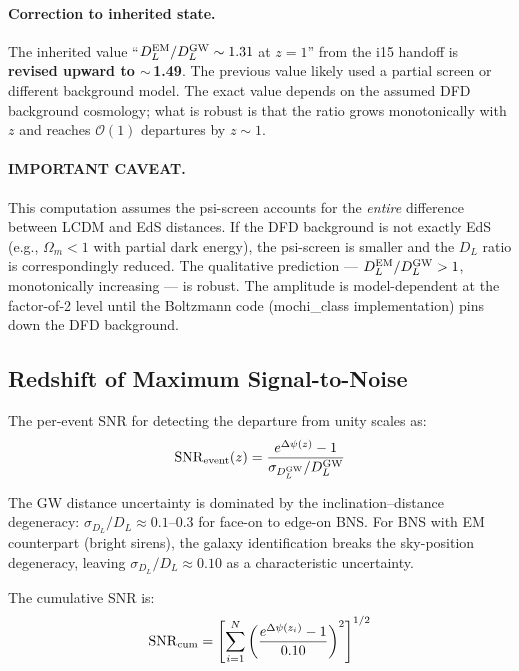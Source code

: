 \documentclass[11pt,a4paper]{article}
\newcommand{\Dpsi}{\Delta\psi}
\begin{document}
\paragraph{Correction to inherited state.}
The inherited value ``$D_L^{\rm EM}/D_L^{\rm GW} \sim 1.31$ at $z=1$''
from the i15 handoff is \textbf{revised upward to $\sim$\,1.49}.  The
previous value likely used a partial screen or different background
model.  The exact value depends on the assumed DFD background cosmology;
what is robust is that the ratio grows monotonically with $z$ and
reaches $\mathcal{O}(1)$ departures by $z \sim 1$.

\paragraph{IMPORTANT CAVEAT.}
This computation assumes the psi-screen accounts for the \emph{entire}
difference between LCDM and EdS distances.  If the DFD background is
not exactly EdS (e.g., $\Omega_m < 1$ with partial dark energy), the
psi-screen is smaller and the $D_L$ ratio is correspondingly reduced.
The qualitative prediction --- $D_L^{\rm EM}/D_L^{\rm GW} > 1$,
monotonically increasing --- is robust.  The amplitude is
model-dependent at the factor-of-2 level until the Boltzmann code
(mochi\_class implementation) pins down the DFD background.

\subsection{Redshift of Maximum Signal-to-Noise}

The per-event SNR for detecting the departure from unity scales as:
\begin{equation}
{\rm SNR}_{\rm event}(z) = \frac{e^{\Dpsi(z)} - 1}
{\sigma_{D_L^{\rm GW}}/D_L^{\rm GW}}
\end{equation}

The GW distance uncertainty is dominated by the inclination--distance
degeneracy: $\sigma_{D_L}/D_L \approx 0.1$--$0.3$ for face-on to
edge-on BNS.  For BNS with EM counterpart (bright sirens), the
galaxy identification breaks the sky-position degeneracy, leaving
$\sigma_{D_L}/D_L \approx 0.10$ as a characteristic uncertainty.

The cumulative SNR is:
\begin{equation}
{\rm SNR}_{\rm cum} = \left[\sum_{i=1}^{N}
\left(\frac{e^{\Dpsi(z_i)} - 1}{0.10}\right)^2\right]^{1/2}
\end{equation}
\end{document}
